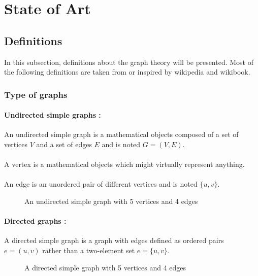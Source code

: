 \section{State of Art}
\subsection{Definitions}
In this subsection, definitions about the graph theory will be presented. Most
of the following definitions are taken from or inspired by wikipedia and
wikibook.

\subsubsection{Type of graphs}
\paragraph{Undirected simple graphs :}
An undirected simple graph is a mathematical objects composed of a set of
vertices $V$ and a set of edges $E$ and is noted $G = (V,E)$.

\paragraph{}
A vertex is a mathematical objects which might virtually represent anything.

\paragraph{}
An edge is an unordered pair of different vertices and is noted $\{u,v\}$.

\begin{figure}[!h]
  \begin{center}
    
  \end{center}
  \caption{An undirected simple graph with 5 vertices and 4 edges}
\end{figure}

\paragraph{Directed graphs :} 
A directed simple graph is a graph with edges defined as ordered pairs
$e = (u,v)$ rather than a two-element set $e = \{u,v\}$.
\begin{figure}[!h]
  \begin{center}
    
  \end{center}
  \caption{A directed simple graph with 5 vertices and 4 edges}
\end{figure}

